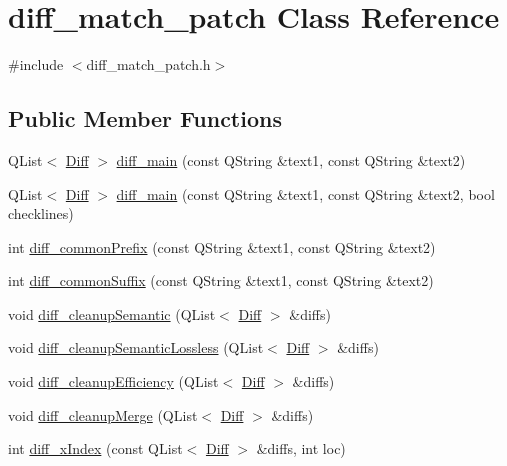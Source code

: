 \hypertarget{classdiff__match__patch}{}\section{diff\+\_\+match\+\_\+patch Class Reference}
\label{classdiff__match__patch}


{\ttfamily \#include $<$diff\+\_\+match\+\_\+patch.\+h$>$}

\subsection*{Public Member Functions}
\begin{DoxyCompactItemize}
\item 
Q\+List$<$ \hyperlink{class_diff}{Diff} $>$ \hyperlink{classdiff__match__patch_a82fe78383b2fddf542fe83e057252e53}{diff\+\_\+main} (const Q\+String \&text1, const Q\+String \&text2)
\item 
Q\+List$<$ \hyperlink{class_diff}{Diff} $>$ \hyperlink{classdiff__match__patch_a106a1cb355978e1d2c60fb6487667fe3}{diff\+\_\+main} (const Q\+String \&text1, const Q\+String \&text2, bool checklines)
\item 
int \hyperlink{classdiff__match__patch_a6139ad292f602b8b9295fe0c48709e31}{diff\+\_\+common\+Prefix} (const Q\+String \&text1, const Q\+String \&text2)
\item 
int \hyperlink{classdiff__match__patch_aed765d65d9e6fb78de3725416a262586}{diff\+\_\+common\+Suffix} (const Q\+String \&text1, const Q\+String \&text2)
\item 
void \hyperlink{classdiff__match__patch_a1150e91652b023e8893555f737ac9894}{diff\+\_\+cleanup\+Semantic} (Q\+List$<$ \hyperlink{class_diff}{Diff} $>$ \&diffs)
\item 
void \hyperlink{classdiff__match__patch_afd96870070c1dc460d1c261fa3f0f485}{diff\+\_\+cleanup\+Semantic\+Lossless} (Q\+List$<$ \hyperlink{class_diff}{Diff} $>$ \&diffs)
\item 
void \hyperlink{classdiff__match__patch_a41df9d26471d7d9f4ca085ab9f5da945}{diff\+\_\+cleanup\+Efficiency} (Q\+List$<$ \hyperlink{class_diff}{Diff} $>$ \&diffs)
\item 
void \hyperlink{classdiff__match__patch_ad64d391bc3f34cad326f869eedb748f9}{diff\+\_\+cleanup\+Merge} (Q\+List$<$ \hyperlink{class_diff}{Diff} $>$ \&diffs)
\item 
int \hyperlink{classdiff__match__patch_a91474da17c89bab2ca34efa207fe85b4}{diff\+\_\+x\+Index} (const Q\+List$<$ \hyperlink{class_diff}{Diff} $>$ \&diffs, int loc)

\end{DoxyCompactItemize}
